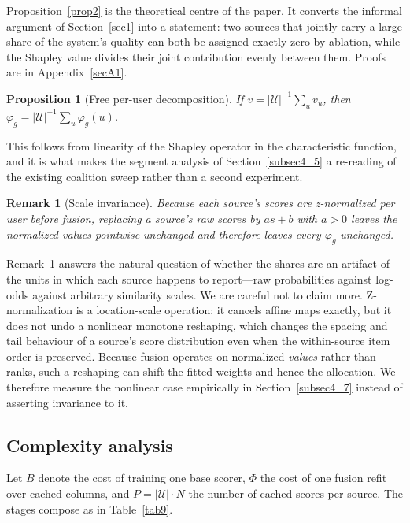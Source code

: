 \documentclass[pdflatex,sn-mathphys-num]{sn-jnl}%
\theoremstyle{thmstyleone}%
\newtheorem{proposition}[theorem]{Proposition}%
\theoremstyle{thmstyletwo}%
\newtheorem{remark}{Remark}%
\theoremstyle{thmstylethree}%
\newcommand{\Uset}{\mathcal{U}}
\begin{document}
Proposition~\ref{prop2} is the theoretical centre of the paper. It converts the informal argument of Section~\ref{sec1} into a statement: two sources that jointly carry a large share of the system's quality can both be assigned exactly zero by ablation, while the Shapley value divides their joint contribution evenly between them. Proofs are in Appendix~\ref{secA1}.

\begin{proposition}[Free per-user decomposition]\label{prop3}
If $v=|\Uset|^{-1}\sum_{u}v_u$, then $\varphi_g=|\Uset|^{-1}\sum_{u}\varphi_g(u)$.
\end{proposition}

This follows from linearity of the Shapley operator in the characteristic function, and it is what makes the segment analysis of Section~\ref{subsec4_5} a re-reading of the existing coalition sweep rather than a second experiment.

\begin{remark}[Scale invariance]\label{rem1}
Because each source's scores are z-normalized per user before fusion, replacing a source's raw scores by $as+b$ with $a>0$ leaves the normalized values pointwise unchanged and therefore leaves every $\varphi_g$ unchanged.
\end{remark}

Remark~\ref{rem1} answers the natural question of whether the shares are an artifact of the units in which each source happens to report---raw probabilities against log-odds against arbitrary similarity scales. We are careful not to claim more. Z-normalization is a location-scale operation: it cancels affine maps exactly, but it does not undo a nonlinear monotone reshaping, which changes the spacing and tail behaviour of a source's score distribution even when the within-source item order is preserved. Because fusion operates on normalized \emph{values} rather than ranks, such a reshaping can shift the fitted weights and hence the allocation. We therefore measure the nonlinear case empirically in Section~\ref{subsec4_7} instead of asserting invariance to it.

\subsection{Complexity analysis}\label{subsec3_10}

Let $B$ denote the cost of training one base scorer, $\Phi$ the cost of one fusion refit over cached columns, and $P=|\Uset|\cdot N$ the number of cached scores per source. The stages compose as in Table~\ref{tab9}.
\end{document}
